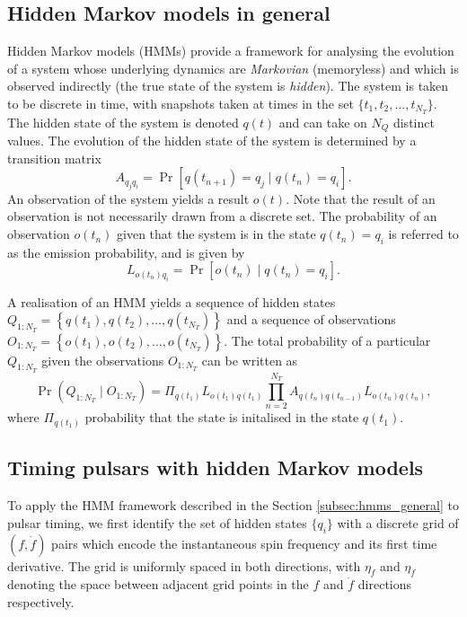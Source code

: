 \documentclass{article}
\begin{document}
\subsection{Hidden Markov models in general}
Hidden Markov models (HMMs) provide a framework for analysing the evolution of a system whose underlying dynamics are \emph{Markovian} (memoryless) and which is observed indirectly (the true state of the system is \emph{hidden}).
The system is taken to be discrete in time, with snapshots taken at times in the set $\{t_1, t_2, \ldots, t_{N_T}\}$.
The hidden state of the system is denoted $q(t)$ and can take on $N_Q$ distinct values.
The evolution of the hidden state of the system is determined by a transition matrix \begin{equation} A_{q_j q_i} = \Pr[q(t_{n+1}) = q_j \mid q(t_n) = q_i]. \end{equation}
An observation of the system yields a result $o(t)$. 
Note that the result of an observation is not necessarily drawn from a discrete set.
The probability of an observation $o(t_n)$ given that the system is in the state $q(t_n) = q_i$ is referred to as the emission probability, and is given by \begin{equation} L_{o(t_n)q_i} = \Pr[o(t_n) \mid q(t_n) = q_i]. \end{equation}

A realisation of an HMM yields a sequence of hidden states $Q_{1:N_T} = \left\{q(t_1), q(t_2), \ldots, q(t_{N_T})\right\}$ and a sequence of observations $O_{1:N_T} = \left\{o(t_1), o(t_2), \ldots, o(t_{N_T})\right\}$.
The total probability of a particular $Q_{1:N_T}$ given the observations $O_{1:N_T}$ can be written as \begin{equation} \Pr(Q_{1:N_T} \mid O_{1:N_T}) = \Pi_{q(t_1)}L_{o(t_1)q(t_1)}\prod_{n=2}^{N_T}A_{q(t_n)q(t_{n-1})}L_{o(t_n)q(t_n)}, \end{equation}
where $\Pi_{q(t_1)}$ probability that the state is initalised in the state $q(t_1)$.

\subsection{Timing pulsars with hidden Markov models}
To apply the HMM framework described in the Section \ref{subsec:hmms_general} to pulsar timing, we first identify the set of hidden states $\{q_i\}$ with a discrete grid of $(f, \dot{f})$ pairs which encode the instantaneous spin frequency and its first time derivative.
The grid is uniformly spaced in both directions, with $\eta_f$ and $\eta_{\dot{f}}$ denoting the space between adjacent grid points in the $f$ and $\dot{f}$ directions respectively.
\end{document}
